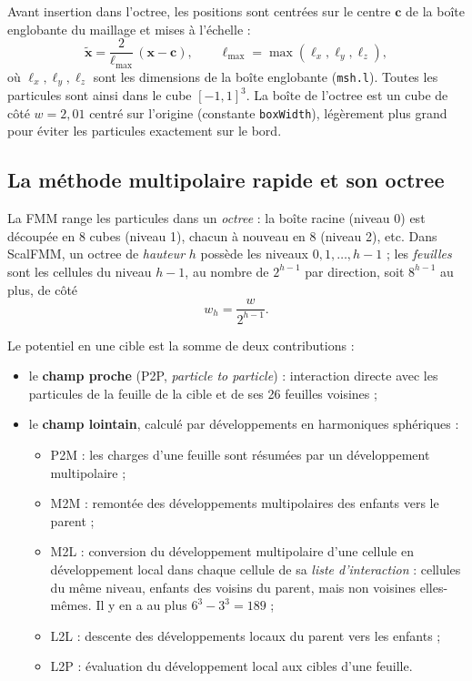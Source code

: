 \documentclass[11pt,a4paper]{article}
\newcommand{\code}[1]{\texttt{#1}}
\begin{document}
Avant insertion dans l'octree, les positions sont centrées sur le centre $\mathbf{c}$ de la boîte
englobante du maillage et mises à l'échelle :
\begin{equation}
\tilde{\mathbf{x}} = \frac{2}{\ell_{\max}}\,(\mathbf{x} - \mathbf{c}),
\qquad \ell_{\max} = \max(\ell_x, \ell_y, \ell_z),
\end{equation}
où $\ell_x, \ell_y, \ell_z$ sont les dimensions de la boîte englobante (\code{msh.l}). Toutes les
particules sont ainsi dans le cube $[-1,1]^3$. La boîte de l'octree est un cube de côté
$w = 2{,}01$ centré sur l'origine (constante \code{boxWidth}), légèrement plus grand pour éviter
les particules exactement sur le bord.

\subsection{La méthode multipolaire rapide et son octree}

La FMM range les particules dans un \emph{octree} : la boîte racine (niveau 0) est découpée en
8 cubes (niveau 1), chacun à nouveau en 8 (niveau 2), etc. Dans ScalFMM, un octree de
\emph{hauteur} $h$ possède les niveaux $0, 1, \dots, h-1$ ; les \emph{feuilles} sont les cellules
du niveau $h-1$, au nombre de $2^{h-1}$ par direction, soit $8^{h-1}$ au plus, de côté
\begin{equation}
w_{h} = \frac{w}{2^{h-1}}.
\end{equation}

Le potentiel en une cible est la somme de deux contributions :
\begin{itemize}
  \item le \textbf{champ proche} (P2P, \emph{particle to particle}) : interaction directe avec les
        particules de la feuille de la cible et de ses 26 feuilles voisines ;
  \item le \textbf{champ lointain}, calculé par développements en harmoniques sphériques :
        \begin{itemize}
          \item P2M : les charges d'une feuille sont résumées par un développement multipolaire ;
          \item M2M : remontée des développements multipolaires des enfants vers le parent ;
          \item M2L : conversion du développement multipolaire d'une cellule en développement
                local dans chaque cellule de sa \emph{liste d'interaction} : cellules du même
                niveau, enfants des voisins du parent, mais non voisines elles-mêmes. Il y en a
                au plus $6^3 - 3^3 = 189$ ;
          \item L2L : descente des développements locaux du parent vers les enfants ;
          \item L2P : évaluation du développement local aux cibles d'une feuille.
        \end{itemize}
\end{itemize}
\end{document}
